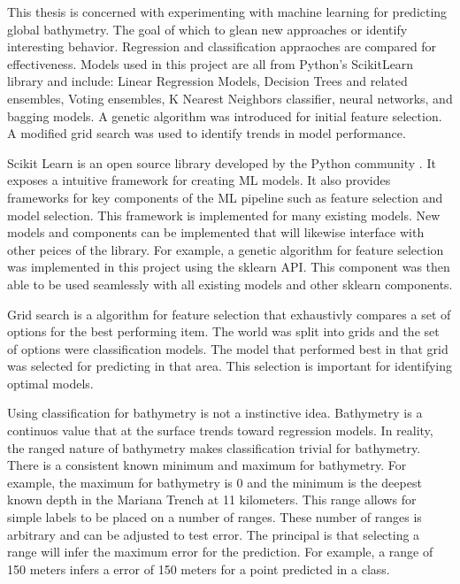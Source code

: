 \par
This thesis is concerned with experimenting with machine learning for predicting global bathymetry.
The goal of which to glean new approaches or identify interesting behavior.
Regression and classification appraoches are compared for effectiveness.
Models used in this project are all from Python's ScikitLearn library and include: Linear Regression Models, Decision Trees and related ensembles, Voting ensembles, K Nearest Neighbors classifier, neural networks, and bagging models.
A genetic algorithm was introduced for initial feature selection.
A modified grid search was used to identify trends in model performance.

\par
Scikit Learn is an open source library developed by the Python community \cite{scikit-learn}.
It exposes a intuitive framework for creating \ac{ML} models.
It also provides frameworks for key components of the \ac{ML} pipeline such as feature selection and model selection.
This framework is implemented for many existing models.
New models and components can be implemented that will likewise interface with other peices of the library.
For example, a genetic algorithm for feature selection was implemented in this project using the sklearn \ac{API}.
This component was then able to be used seamlessly with all existing models and other sklearn components.

\par
Grid search is a algorithm for feature selection that exhaustivly compares a set of options for the best performing item.
The world was split into grids and the set of options were classification models.
The model that performed best in that grid was selected for predicting in that area.
This selection is important for identifying optimal models.


\par
Using classification for bathymetry is not a instinctive idea.
Bathymetry is a continuos value that at the surface trends toward regression models.
In reality, the ranged nature of bathymetry makes classification trivial for bathymetry.
There is a consistent known minimum and maximum for bathymetry.
For example, the maximum for bathymetry is 0 and the minimum is the deepest known depth in the Mariana Trench at 11 kilometers.
This range allows for simple labels to be placed on a number of ranges.
These number of ranges is arbitrary and can be adjusted to test error.
The principal is that selecting a range will infer the maximum error for the prediction.
For example, a range of 150 meters infers a error of 150 meters for a point predicted in a class.




